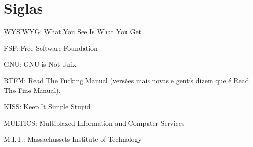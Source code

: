 
\chapter{Siglas}

WYSIWYG: What You See Is What You Get

FSF: Free Software Foundation

GNU: GNU is Not Unix

RTFM: Read The Fucking Manual (versões mais novas e gentís dizem que é Read
The Fine Manual).

KISS: Keep It Simple Stupid

MULTICS: Multiplexed Information and Computer Services

M.I.T.: Massachussets Institute of Technology
